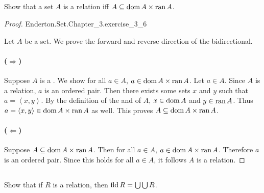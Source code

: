 \documentclass{report}
\newcommand{\pair}[1]{\left< #1 \right>}
\begin{document}
\subsection{}%

Show that a set $A$ is a relation iff $A \subseteq \mathop{\text{dom}}{A} \times \mathop{\text{ran}}{A}$.

\begin{proof}

    {Enderton.Set.Chapter\_3.exercise\_3\_6}

  Let $A$ be a set.
  We prove the forward and reverse direction of the bidirectional.

  \paragraph{($\Rightarrow$)}%

    Suppose $A$ is a .
    We show for all $a \in A$, $a \in \mathop{\text{dom}}{A} \times \mathop{\text{ran}}{A}$.
    Let $a \in A$.
    Since $A$ is a relation, $a$ is an ordered pair.
    Then there exists some sets $x$ and $y$ such that $a = \pair{x, y}$.
    By the definition of the  and  of
      $A$, $x \in \mathop{\text{dom}}{A}$ and $y \in \mathop{\text{ran}}{A}$.
    Thus $a = \pair{x, y} \in \dom{A} \times \ran{A}$ as well.
    This proves $A \subseteq \mathop{\text{dom}}{A} \times \mathop{\text{ran}}{A}$.

  \paragraph{($\Leftarrow$)}%

    Suppose $A \subseteq \mathop{\text{dom}}{A} \times \mathop{\text{ran}}{A}$.
    Then for all $a \in A$, $a \in \mathop{\text{dom}}{A} \times \mathop{\text{ran}}{A}$.
    Therefore $a$ is an ordered pair.
    Since this holds for all $a \in A$, it follows $A$ is a relation.

\end{proof}

\subsection{}%

Show that if $R$ is a relation, then $\mathop{\text{fld}}{R} = \bigcup\bigcup R$.
\end{document}
